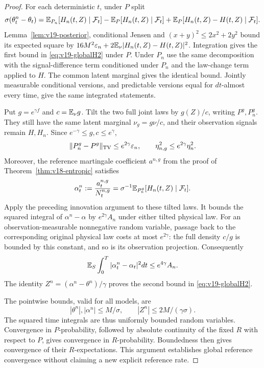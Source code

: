 \begin{proof}
For each deterministic $t$, under $P$ split
\[
 \sigma(\theta_t^n-\theta_t)
 =\mathbb E_{P_n}[H_n(t,Z)\mid\mathcal F_t]
      -\mathbb E_P[H_n(t,Z)\mid\mathcal F_t]
      +\mathbb E_P[H_n(t,Z)-H(t,Z)\mid\mathcal F_t].
\]
Lemma~\ref{lem:v19-posterior}, conditional Jensen and
$(x+y)^2\le2x^2+2y^2$ bound its expected square by
$16M^2\varepsilon_n+2\mathbb E_\nu|H_n(t,Z)-H(t,Z)|^2$.
Integration gives the first bound in \eqref{eq:v19-globalH2} under $P$.
Under $P_n$ use the same decomposition with the signal-difference term
conditioned under $P_n$ and the law-change term applied to $H$. The common
latent marginal gives the identical bound. Jointly measurable conditional
versions, and predictable versions equal for $dt$-almost every time, give
the same integrated statements.

Put $g=e^{\gamma f}$ and $c=\mathbb E_\nu g$. Tilt the two full joint laws by
$g(Z)/c$, writing $P^g,P_n^g$. They still have the same latent marginal
$\nu_g=g\nu/c$, and their observation signals remain $H,H_n$. Since
$e^{-\gamma}\le g,c\le e^\gamma$,
\[
 \|P_n^g-P^g\|_{\rm TV}\le e^{2\gamma}\varepsilon_n,
 \qquad \eta_{n,g}^2\le e^{2\gamma}\eta_n^2.
\]
Moreover, the reference martingale coefficient $a^{n,g}$ from the proof
of Theorem~\ref{thm:v18-entropic} satisfies
\[
 \alpha_t^n:=\frac{a_t^{n,g}}{N_t^{n,g}}
       =\sigma^{-1}\mathbb E_{P_n^g}[H_n(t,Z)\mid\mathcal F_t].
\]
Apply the preceding innovation argument to these tilted laws. It bounds
the squared integral of $\alpha^n-\alpha$ by $e^{2\gamma}A_n$ under
either tilted physical law. For an observation-measurable nonnegative
random variable, passage back to the corresponding original physical law
costs at most $e^{2\gamma}$: the full density $c/g$ is bounded by this
constant, and so is its observation projection. Consequently
\[
 \mathbb E_S\int_0^T|\alpha_t^n-\alpha_t|^2dt\le e^{4\gamma}A_n.
\]
The identity $Z^n=(\alpha^n-\theta^n)/\gamma$ proves the second bound
in \eqref{eq:v19-globalH2}.

The pointwise bounds, valid for all models, are
\begin{equation}\label{eq:v19-uniformcoefficients}
 |\theta^n|,|\alpha^n|\le M/\sigma,
 \qquad |Z^n|\le2M/(\gamma\sigma).
\end{equation}
The squared time integrals are thus uniformly bounded random variables.
Convergence in $P$-probability, followed by absolute continuity of the fixed
$R$ with respect to $P$, gives convergence in $R$-probability. Boundedness
then gives convergence of their $R$-expectations. This argument establishes
global reference convergence without claiming a new explicit reference rate.


\end{proof}

